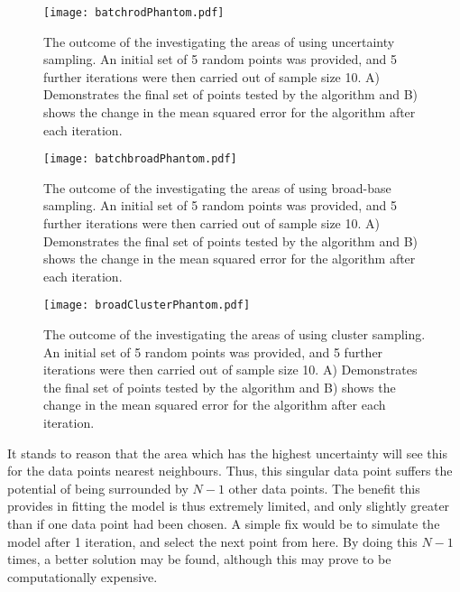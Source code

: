 \begin{figure}[H]
  \begin{center}
    \texttt{[image: batchrodPhantom.pdf]}
    \caption[Batch Uncertainty Sampling]{The outcome of the investigating the areas of using uncertainty sampling. An initial set of 5 random points was provided, and 5 further iterations were then carried out of sample size 10. A) Demonstrates the final set of points tested by the algorithm and B) shows the change in the mean squared error for the algorithm after each iteration.}
  \end{center}
\end{figure}

\begin{figure}[H]
  \begin{center}
    \texttt{[image: batchbroadPhantom.pdf]}
    \caption[Batch Broad-Base Sampling]{The outcome of the investigating the areas of using broad-base sampling. An initial set of 5 random points was provided, and 5 further iterations were then carried out of sample size 10. A) Demonstrates the final set of points tested by the algorithm and B) shows the change in the mean squared error for the algorithm after each iteration.}
  \end{center}
\end{figure}

\begin{figure}[H]
  \begin{center}
    \texttt{[image: broadClusterPhantom.pdf]}
    \caption[Batch Cluster Sampling]{The outcome of the investigating the areas of using cluster sampling. An initial set of 5 random points was provided, and 5 further iterations were then carried out of sample size 10. A) Demonstrates the final set of points tested by the algorithm and B) shows the change in the mean squared error for the algorithm after each iteration.}
  \end{center}
\end{figure}


It stands to reason that the area which has the highest uncertainty will see this for the data points nearest neighbours. Thus, this singular data point suffers the potential of being surrounded by $N-1$ other data points. The benefit this provides in fitting the model is thus extremely limited, and only slightly greater than if one data point had been chosen. A simple fix would be to simulate the model after 1 iteration, and select the next point from here. By doing this $N-1$ times, a better solution may be found, although this may prove to be computationally expensive.


